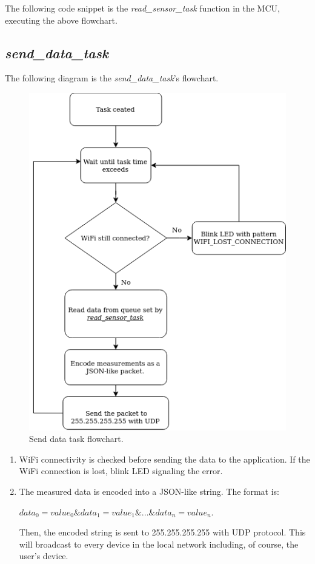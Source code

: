 \documentclass[../main.tex]{subfiles}
\begin{document}
    \pagebreak
    \justify
    The following code snippet is the \textit{read\_sensor\_task} function in the MCU, executing the above flowchart.
    

    \pagebreak
    \subsection{\textit{send\_data\_task}}
    The following diagram is the \textit{send\_data\_task}'s flowchart.

    \begin{figure}[!h]
        \centerline{\includegraphics[scale=0.55]{media/send_data_task_flowchart.drawio.png}}
        \caption{Send data task flowchart.}
        \label{fig:send_data_task_flowchart}
    \end{figure}
    
    \begin{enumerate}
        \item WiFi connectivity is checked before sending the data to the application. If the WiFi connection is lost, blink LED signaling the error.
        \item The measured data is encoded into a JSON-like string. The format is: \newline \centerline{${data}_0={value}_0\&{data}_1={value}_1\&...\&{data}_n={value}_n$.}\newline Then, the encoded string is sent to 255.255.255.255 with UDP protocol. This will broadcast to every device in the local network including, of course, the user's device.
    \end{enumerate}
\end{document}

